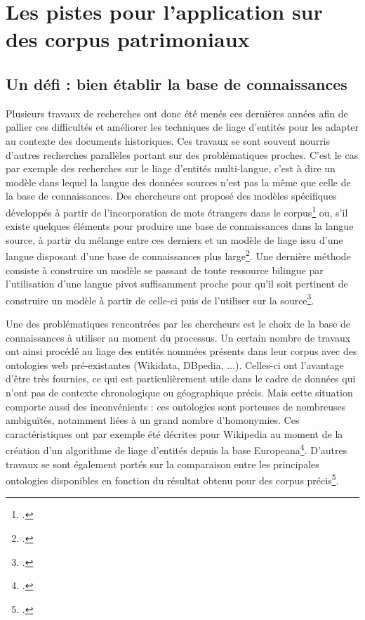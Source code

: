 \documentclass[a4paper,12pt,twoside]{book}
\begin{document}
	\section{Les pistes pour l'application sur des corpus patrimoniaux}
	
	\subsection{Un défi : bien établir la base de connaissances}
	
	Plusieurs travaux de recherches ont donc été menés ces dernières années afin de pallier ces difficultés et améliorer les techniques de liage d'entités pour les adapter au contexte des documents historiques. Ces travaux se sont souvent nourris d'autres recherches parallèles portant sur des problématiques proches. C'est le cas par exemple des recherches sur le liage d'entités multi-langue, c'est à dire un modèle dans lequel la langue des données sources n'est pas la même que celle de la base de connaissances. Des chercheurs ont proposé des modèles spécifiques développés à partir de l'incorporation de mots étrangers dans le corpus\footcite{linhares_pontes_linking_2020} ou, s'il existe quelques éléments pour produire une base de connaissances dans la langue source, à partir du mélange entre ces derniers et un modèle de liage issu d'une langue disposant d'une base de connaissances plus large\footcite{zhou_towards_2019}. Une dernière méthode consiste à construire un modèle se passant de toute ressource bilingue par l'utilisation d'une langue pivot suffisamment proche pour qu'il soit pertinent de construire un modèle à partir de celle-ci puis de l'utiliser sur la source\footcite{rijhwani_zero-shot_2019}.
	
	Une des problématiques rencontrées par les chercheurs est le choix de la base de connaissances à utiliser au moment du processus. Un certain nombre de travaux ont ainsi procédé au liage des entités nommées présents dans leur corpus avec des ontologies web pré-existantes (Wikidata, DBpedia, ...). Celles-ci ont l'avantage d'être très fournies, ce qui est particulièrement utile dans le cadre de données qui n'ont pas de contexte chronologique ou géographique précis. Mais cette situation comporte aussi des inconvénients : ces ontologies sont porteuses de nombreuses ambiguïtés, notamment liées à un grand nombre d'homonymies. Ces caractéristiques ont par exemple été décrites pour Wikipedia au moment de la création d'un algorithme de liage d'entités depuis la base Europeana\footcite{agirre_matching_2012}. D'autres travaux se sont également portés sur la comparaison entre les principales ontologies disponibles en fonction du résultat obtenu pour des corpus précis\footcite{soudani_adaptation_2018}.
	
\end{document}
